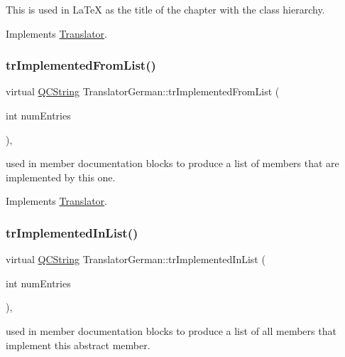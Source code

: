 This is used in La\+TeX as the title of the chapter with the class hierarchy. 

Implements \mbox{\hyperlink{class_translator}{Translator}}.

\mbox{\label{class_translator_german_a0db6c86a748459f9eec496aac897dd9f}} 
\subsubsection{\texorpdfstring{trImplementedFromList()}{trImplementedFromList()}}
{\footnotesize\ttfamily virtual \mbox{\hyperlink{class_q_c_string}{Q\+C\+String}} Translator\+German\+::tr\+Implemented\+From\+List (\begin{DoxyParamCaption}\item[{int}]{num\+Entries }\end{DoxyParamCaption})\hspace{0.3cm}{\ttfamily [inline]}, {\ttfamily [virtual]}}

used in member documentation blocks to produce a list of members that are implemented by this one. 

Implements \mbox{\hyperlink{class_translator}{Translator}}.

\mbox{\label{class_translator_german_aacb18d80b7a94846088c6bfd14c88d50}} 
\subsubsection{\texorpdfstring{trImplementedInList()}{trImplementedInList()}}
{\footnotesize\ttfamily virtual \mbox{\hyperlink{class_q_c_string}{Q\+C\+String}} Translator\+German\+::tr\+Implemented\+In\+List (\begin{DoxyParamCaption}\item[{int}]{num\+Entries }\end{DoxyParamCaption})\hspace{0.3cm}{\ttfamily [inline]}, {\ttfamily [virtual]}}

used in member documentation blocks to produce a list of all members that implement this abstract member. 

